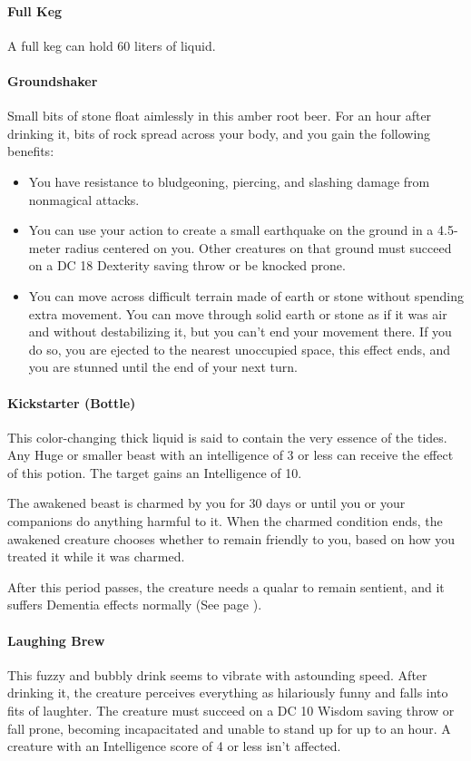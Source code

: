 \paragraph{Full Keg}
    A full keg can hold 60 liters of liquid.
\paragraph{Groundshaker} %
    Small bits of stone float aimlessly in this amber root beer.
    For an hour after drinking it, bits of rock spread across your body, and you gain the following benefits:
    \begin{itemize}
        \item You have resistance to bludgeoning, piercing, and slashing damage from nonmagical attacks.
        \item You can use your action to create a small earthquake on the ground in a 4.5-meter radius centered on you.
        Other creatures on that ground must succeed on a DC 18 Dexterity saving throw or be knocked prone.
        \item You can move across difficult terrain made of earth or stone without spending extra movement.
        You can move through solid earth or stone as if it was air and without destabilizing it, but you can't end your movement there.
        If you do so, you are ejected to the nearest unoccupied space, this effect ends, and you are stunned until the end of your next turn.
    \end{itemize}
\paragraph{Kickstarter (Bottle)} %
    This color-changing thick liquid is said to contain the very essence of the tides.
    Any Huge or smaller beast with an intelligence of 3 or less can receive the effect of this potion.
    The target gains an Intelligence of 10.

    The awakened beast is charmed by you for 30 days or until you or your companions do anything harmful to it.
    When the charmed condition ends, the awakened creature chooses whether to remain friendly to you, based on how you treated it while it was charmed.

    After this period passes, the creature needs a qualar to remain sentient, and it suffers Dementia effects normally (See page \pageref{ssec::dementia}).
\paragraph{Laughing Brew} %
    This fuzzy and bubbly drink seems to vibrate with astounding speed.
    After drinking it, the creature perceives everything as hilariously funny and falls into fits of laughter.
    The creature must succeed on a DC 10 Wisdom saving throw or fall prone, becoming incapacitated and unable to stand up for up to an hour.
    A creature with an Intelligence score of 4 or less isn't affected.


